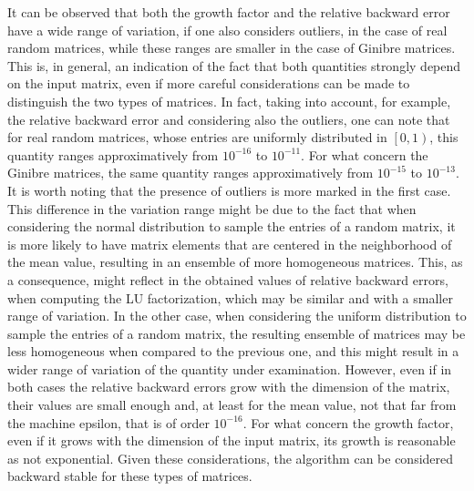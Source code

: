 \documentclass[a4paper,11pt]{article}
\begin{document}
\noindent It can be observed that both the growth factor and the relative backward error have a wide range of variation, if one also considers outliers, in the case of real random matrices, while these ranges are smaller in the case of Ginibre matrices. This is, in general, an indication of the fact that both quantities strongly depend on the input matrix, even if more careful considerations can be made to distinguish the two types of matrices. In fact, taking into account, for example, the relative backward error and considering also the outliers, one can note that for real random matrices, whose entries are uniformly distributed in $\left[0,1\right)$, this quantity ranges approximatively from $10^{-16}$ to $10^{-11}$. For what concern the Ginibre matrices, the same quantity ranges approximatively from $10^{-15}$ to $10^{-13}$. It is worth noting that the presence of outliers is more marked in the first case.
This difference in the variation range might be due to the fact that when considering the normal distribution to sample the entries of a random matrix, it is more likely to have matrix elements that are centered in the neighborhood of the mean value, resulting in an ensemble of more homogeneous matrices. This, as a consequence, might reflect in the obtained values of relative backward errors, when computing the LU factorization, which may be similar and with a smaller range of variation. In the other case, when considering the uniform distribution to sample the entries of a random matrix, the resulting ensemble of matrices may be less homogeneous when compared to the previous one, and this might result in a wider range of variation of the quantity under examination. However, even if in both cases the relative backward errors grow with the dimension of the matrix, their values are small enough and, at least for the mean value, not that far from the machine epsilon, that is of order $10^{-16}$. For what concern the growth factor, even if it grows with the dimension of the input matrix, its growth is reasonable as not exponential. Given these considerations, the algorithm can be considered backward stable for these types of matrices.\\
\end{document}

